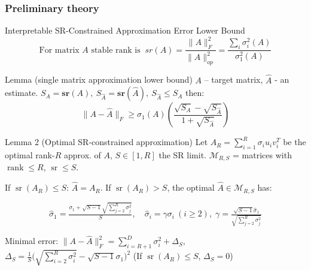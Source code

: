 \documentclass[10pt]{beamer}
\DeclareMathOperator{\sr}{sr}
\DeclareMathOperator{\rank}{rank}
\begin{document}
\begin{frame}
    \frametitle{Preliminary theory}
    \vspace{-0.2cm}
    \begin{block}{Interpretable SR-Constrained Approximation Error Lower Bound}
        \vspace{-0.5cm}
        $$\text{For matrix } A \text{ stable rank is } ~ sr(A) = \frac{\|A\|_F^2}{\|A\|_{op}^2} = \frac{\sum_i \sigma_i^2(A)}{\sigma_1^2(A)}$$
        \vspace{-0.5cm}
    \end{block}
    \begin{block}{Lemma (single matrix approximation lower bound)}
        $A$ -- target matrix, $\hat{A}$ - an estimate. $S_A = \mathbf{sr}(A), ~S_{\hat{A}} = \mathbf{sr}(\hat{A}), ~S_{\hat{A}} \leqslant S_A$ then:
        \vspace{-0.3cm}
        $$\|A - \hat{A}\|_F \geqslant \sigma_1(A)\left(\frac{\sqrt{S_A} - \sqrt{S_{\hat{A}}}}{1 + \sqrt{S_{\hat{A}}}}\right)$$
        \vspace{-0.5cm}
    \end{block}
    \begin{block}{Lemma 2 (Optimal SR-constrained approximation)}
        Let $A_R = \sum_{i=1}^R \sigma_i u_i v_i^T$ be the optimal rank-$R$ approx. of $A$, $S \in [1, R]$ the SR limit.
        $\mathcal{M}_{R,S}$ = matrices with $\rank \leqslant R$, $\sr \leqslant S$.

        If $\sr(A_R) \leqslant S$: $\hat{A} = A_R$. If $\sr(A_R) > S$, the optimal $\hat{A} \in \mathcal{M}_{R,S}$ has:
        \vspace{-0.3cm}

        $$\hat{\sigma}_1 = \tfrac{\sigma_1 + \sqrt{S-1}\sqrt{\sum_{j=2}^R\sigma_j^2}}{S},\quad \hat{\sigma}_i = \gamma \sigma_i ~ (i \geqslant 2), \;\gamma = \tfrac{\sqrt{S-1}\hat{\sigma}_1}{\sqrt{\sum_{j=2}^R\sigma_j^2}}$$
        
        \vspace{-0.3cm}
        Minimal error: $\|A - \hat{A}\|_F^2 = \sum_{i=R+1}^{D}\sigma_i^2 + \Delta_S$, ~ $\Delta_S = \frac{1}{S}\big(\sqrt{\sum_{i=2}^R\sigma_i^2} - \sqrt{S-1}\sigma_1\big)^2$
        \vspace{-0.3cm}
        (If $\sr(A_R) \leqslant S$, $\Delta_S = 0$)
    \end{block}
\end{frame}
\end{document}
